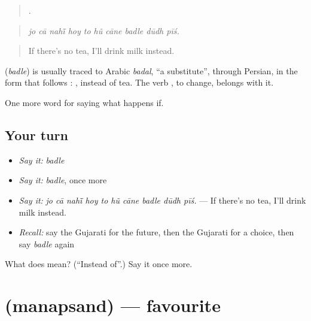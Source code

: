 \begin{quote}
         .
\end{quote}

\begin{quote}
\emph{jo cā nahī̃ hoy to hũ cāne badle dūdh pīś.}
\end{quote}

\begin{quote}
If there's no tea, I'll drink milk instead.
\end{quote}

\begin{cousinweb}
\textbf{} (\emph{badle}) is usually traced to Arabic \emph{badal}, \textquotedblleft{}a substitute\textquotedblright{}, through Persian, in the form that follows \textbf{}: \textbf{ }, instead of tea. The verb \textbf{}, to change, belongs with it.
\end{cousinweb}

\begin{grammarlens}[title={What you've built}]
One more word for saying what happens if.
\end{grammarlens}

\subsection*{Your turn}
\begin{itemize}
\raggedright
  \item \emph{Say it:} \emph{badle}
  \item \emph{Say it:} \emph{badle}, once more
  \item \emph{Say it:} \emph{jo cā nahī̃ hoy to hũ cāne badle dūdh pīś.} — If there's no tea, I'll drink milk instead.
  \item \emph{Recall:} say the Gujarati for the future, then the Gujarati for a choice, then say \emph{badle} again
\end{itemize}

\begin{tcolorbox}[breakable,colback=teal!4,colframe=teal!35!black,title={Before you move on}]
What does  mean? (\textquotedblleft{}Instead of\textquotedblright{}.) Say it once more.
\end{tcolorbox}
\section[\texorpdfstring{\gu{મનપસંદ} (manapsand)}{મનપસંદ (manapsand)}]{ (manapsand) — favourite}

